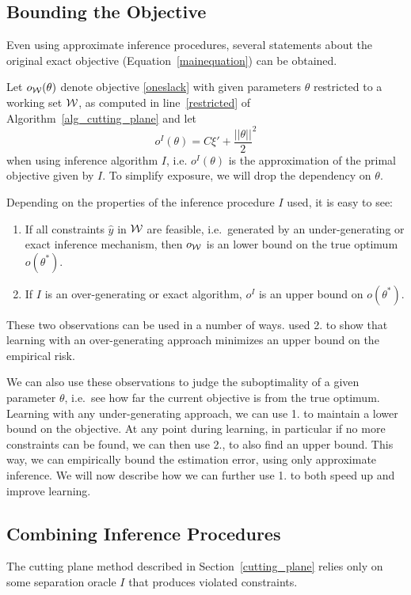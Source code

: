 \subsection{Bounding the Objective}\label{bounds}
Even using approximate inference procedures, several statements
about the original exact objective (Equation~\eqref{mainequation}) can be
obtained.

Let $o_{\mathcal{W}}(\theta)$ denote objective \eqref{oneslack} with
given parameters $\theta$ restricted to a working set $\mathcal{W}$, as computed in
line~\ref{restricted} of Algorithm~\ref{alg_cutting_plane} and  let
\[
    o^I(\theta) = C\xi' + \frac{||\theta||}{2}^2
\]
when using inference algorithm $I$, i.e. $o^I(\theta)$ is the approximation of the primal
objective given by $I$. To simplify exposure, we will drop the dependency on $\theta$.

Depending on the properties of the inference procedure $I$ used, it is easy to see:
\begin{enumerate}
    \item If all constraints $\hat{y}$ in  $\mathcal{W}$ are feasible, i.e.\ generated
        by an under-generating or exact inference mechanism, then $o_{\mathcal{W}}$ is
        an lower bound on the true optimum $o(\theta^*)$.

    \item If $I$ is an over-generating or exact algorithm, $o^I$ is an upper
        bound on $o(\theta^*)$.
\end{enumerate}

These two observations can be used in a number of ways.
\citet{finley2008training} used 2. to show that learning with an
over-generating approach minimizes an upper bound on the empirical risk.

We can also use these observations to judge the suboptimality of a given parameter $\theta$,
i.e.\ see how far the current objective is from the true optimum.
Learning with any under-generating approach, we can use 1. to maintain a lower bound
on the objective. At any point during learning, in particular if no more constraints
can be found, we can then use 2., to also find an upper bound.
This way, we can empirically bound the estimation error, using only approximate
inference.
We will now describe how we can further use 1. to both speed up and improve learning.


\subsection{Combining Inference Procedures}\label{combining}
The cutting plane method described in Section~\ref{cutting_plane} relies only
on some separation oracle $I$ that produces violated constraints.


